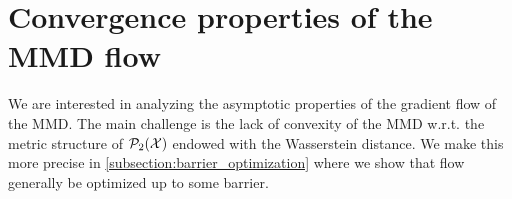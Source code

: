 

\section{Convergence properties of the MMD flow}\label{sec:convergence_mmd_flow}

We are interested in analyzing the asymptotic properties of the gradient flow of the MMD. The main challenge is the lack of convexity of the MMD w.r.t. the metric structure of $\mathcal{P}_2({{\mathcal X}})$ endowed with the  Wasserstein distance. We make this more precise in \cref{subsection:barrier_optimization} where we show that flow generally be optimized up to some barrier.

%
%

